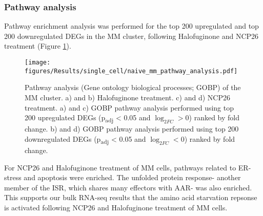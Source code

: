 \subsubsection{Pathway analysis}
Pathway enrichment analysis was performed for the top 200 upregulated and top 200 downregulated DEGs in the MM cluster, following Halofuginone and NCP26 treatment (Figure \ref{fig:naive_mm_pathway_analysis}).
\begin{figure}[htb]
\centering
\texttt{[image: figures/Results/single\_cell/naive\_mm\_pathway\_analysis.pdf]}
\caption[scRNA-seq MM cluster pathway analysis (newly-diagnosed MM)]{Pathway analysis (Gene ontology biological processes; GOBP) of the MM cluster.
    a) and b) Halofuginone treatment.
    c) and d) NCP26 treatment.
a) and c) GOBP pathway analysis performed using top 200 upregulated DEGs (p\textsubscript{adj} < 0.05 and $\log_{2FC}>0$) ranked by fold change.
b) and d) GOBP pathway analysis performed using top 200 downregulated DEGs (p\textsubscript{adj} < 0.05 and $\log_{2FC}<0$) ranked by fold change.}
\label{fig:naive_mm_pathway_analysis}
\end{figure}

For NCP26 and Halofuginone treatment of MM cells, pathways related to ER-stress and apoptosis were enriched.
The unfolded protein response- another member of the ISR, which shares many effectors with AAR- was also enriched.
This supports our bulk RNA-seq results that the amino acid starvation repsonse is activated following NCP26 and Halofuginone treatment of MM cells.


